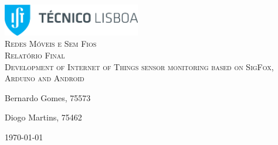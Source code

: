 \begin{titlepage}

	\begin{center}

		\includegraphics[width=6cm]{./title}\\[3cm]

		\textsc{\LARGE Redes Móveis e Sem Fios}\\[1.5cm]

		\textsc{\Large Relatório Final  }\\[1.5cm]
		
		
		\textsc{Development of Internet of Things sensor monitoring based on SigFox, Arduino and Android }\\[1.5cm]
		



		


		\noindent
		\begin{minipage}{0.4\textwidth}
			\begin{flushleft} \large
				Bernardo Gomes, 75573
			\end{flushleft}
		\end{minipage}
		\begin{minipage}{0.4\textwidth}
			\begin{flushright} \large
				Diogo Martins, 75462
			\end{flushright}
		\end{minipage}

		\vfill

		{\large \today}


	\end{center}

\end{titlepage}